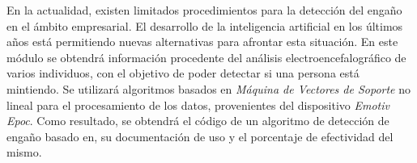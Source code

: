 En la actualidad, existen limitados procedimientos para la detección del engaño en el ámbito empresarial. El desarrollo de la inteligencia artificial en los últimos años está permitiendo nuevas alternativas para afrontar esta situación. En este módulo se obtendrá información procedente del análisis electroencefalográfico de varios individuos, con el objetivo de poder detectar si una persona está mintiendo. Se utilizará algoritmos basados en \textit{Máquina de Vectores de Soporte} no lineal para el procesamiento de los datos, provenientes del dispositivo \textit{Emotiv Epoc}. Como resultado, se obtendrá el código de un algoritmo de detección de engaño basado en, su documentación de uso y el porcentaje de efectividad del mismo. 